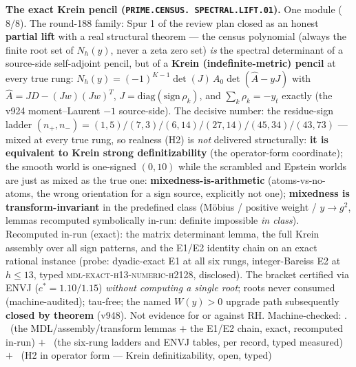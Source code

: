 \documentclass[11pt,a4paper]{article}
\theoremstyle{definition}
\begin{document}
\par\smallskip\noindent\textbf{The exact Krein pencil
(\texttt{PRIME.\allowbreak CENSUS.\allowbreak
SPECTRAL.\allowbreak LIFT.01}).}
One module ($8/8$).  The round-188 family: Spur 1 of the review
plan closed as an honest \textbf{partial lift} with a real
structural theorem --- the census polynomial (always the finite
root set of $N_h(y)$, never a zeta zero set) \emph{is} the
spectral determinant of a source-side self-adjoint pencil, but of
a \textbf{Krein (indefinite-metric) pencil} at every true rung:
$N_h(y) = (-1)^{K-1}\det(J)\,A_0\det(\hat A - yJ)$ with $\hat A =
JD - (Jw)(Jw)^T$, $J = \mathrm{diag}(\mathrm{sign}\,\rho_k)$, and
$\sum_k \rho_k = -y_t$ exactly (the v924 moment--Laurent $-1$
source-side).  The decisive number: the residue-sign ladder
$(n_+, n_-) = (1,5)/(7,3)/(6,14)/(27,14)/(45,34)/(43,73)$ ---
mixed at every true rung, so realness (H2) is \emph{not}
delivered structurally: \textbf{it is equivalent to Krein strong
definitizability} (the operator-form coordinate); the smooth
world is one-signed $(0,10)$ while the scrambled and Epstein
worlds are just as mixed as the true one:
\textbf{mixedness-is-arithmetic} (atoms-vs-no-atoms, the wrong
orientation for a sign source, explicitly not one);
\textbf{mixedness is transform-invariant} in the predefined class
(M\"obius / positive weight / $y \to g^2$, lemmas recomputed
symbolically in-run: definite impossible \emph{in class}).
Recomputed in-run (exact): the matrix determinant lemma, the full
Krein assembly over all sign patterns, and the E1/E2 identity
chain on an exact rational instance (probe: dyadic-exact E1 at
all six rungs, integer-Bareiss E2 at $h \le 13$, typed
\textsc{mdl-exact-h13-numeric-h2128}, disclosed).  The bracket
certified via ENVJ ($c^* = 1.10/1.15$) \emph{without computing a
single root}; roots never consumed (machine-audited); tau-free;
the named $W(y) > 0$ upgrade path subsequently \textbf{closed by
theorem} (v948).  Not evidence for or against RH.
Machine-checked: .
\mE\ (the MDL/assembly/transform lemmas $+$ the E1/E2 chain,
exact, recomputed in-run) $+$ \mC\ (the six-rung ladders and ENVJ
tables, per record, typed measured) $+$ \mO\ (H2 in operator form
--- Krein definitizability, open, typed)
\par\smallskip
\end{document}
